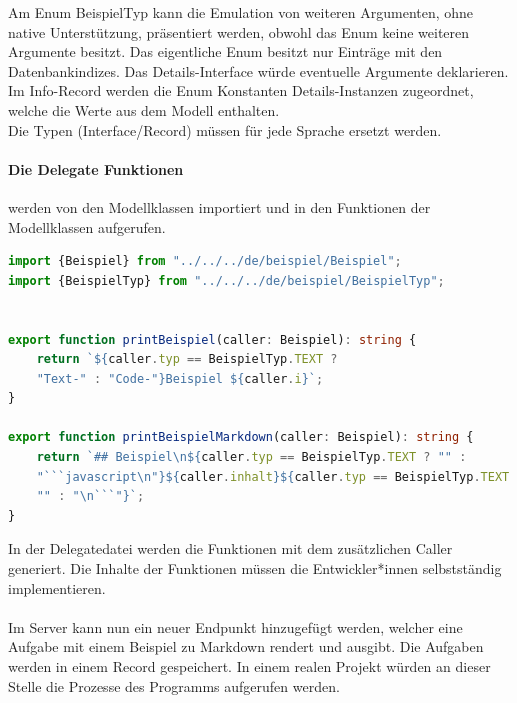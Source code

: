 \documentclass[./einleitung.tex]{subfiles}
\begin{document}
    Am Enum BeispielTyp kann die Emulation von weiteren Argumenten, ohne native Unterstützung, präsentiert werden, obwohl das Enum keine weiteren Argumente besitzt.
    Das eigentliche Enum besitzt nur Einträge mit den Datenbankindizes.
    Das Details-Interface würde eventuelle Argumente deklarieren.
    Im Info-Record werden die Enum Konstanten Details-Instanzen zugeordnet, welche die Werte aus dem Modell enthalten.\\
    Die Typen (Interface/Record) müssen für jede Sprache ersetzt werden.
    
    \paragraph{Die Delegate Funktionen} werden von den Modellklassen importiert und in den Funktionen der Modellklassen aufgerufen.
    \begin{lstlisting}[language=Typescript, caption=BeispielDelegate.ts, label=lst:beispielDelegateTs]
import {Beispiel} from "../../../de/beispiel/Beispiel";
import {BeispielTyp} from "../../../de/beispiel/BeispielTyp";


export function printBeispiel(caller: Beispiel): string {
    return `${caller.typ == BeispielTyp.TEXT ?
    "Text-" : "Code-"}Beispiel ${caller.i}`;
}

export function printBeispielMarkdown(caller: Beispiel): string {
    return `## Beispiel\n${caller.typ == BeispielTyp.TEXT ? "" :
    "```javascript\n"}${caller.inhalt}${caller.typ == BeispielTyp.TEXT ?
    "" : "\n```"}`;
}
    \end{lstlisting}
    In der Delegatedatei werden die Funktionen mit dem zusätzlichen Caller generiert.
    Die Inhalte der Funktionen müssen die Entwickler*innen selbstständig implementieren.
    \\\\
    Im Server kann nun ein neuer Endpunkt hinzugefügt werden, welcher eine Aufgabe mit einem Beispiel zu Markdown rendert und ausgibt.
    Die Aufgaben werden in einem Record gespeichert.
    In einem realen Projekt würden an dieser Stelle die Prozesse des Programms aufgerufen werden.
\end{document}
